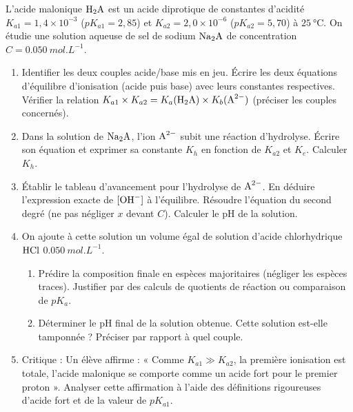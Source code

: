 \documentclass[11pt]{article}
\begin{document}
\begin{exercice}
L'acide malonique $\ce{H2A}$ est un acide diprotique de constantes d'acidité $K_{a1} = 1,4 \times 10^{-3}$ ($pK_{a1} = 2,85$) et $K_{a2} = 2,0 \times 10^{-6}$ ($pK_{a2} = 5,70$) à $\SI{25}{\celsius}$. On étudie une solution aqueuse de sel de sodium $\ce{Na2A}$ de concentration $C = \SI{0.050}{mol.L^{-1}}$.

\begin{enumerate}
    \item Identifier les deux couples acide/base mis en jeu. Écrire les deux équations d'équilibre d'ionisation (acide puis base) avec leurs constantes respectives. Vérifier la relation $K_{a1} \times K_{a2} = K_{a}(\ce{H2A}) \times K_{b}(\ce{A^2-})$ (préciser les couples concernés).
    \item Dans la solution de $\ce{Na2A}$, l'ion $\ce{A^2-}$ subit une réaction d'hydrolyse. Écrire son équation et exprimer sa constante $K_h$ en fonction de $K_{a2}$ et $K_e$. Calculer $K_h$.
    \item Établir le tableau d'avancement pour l'hydrolyse de $\ce{A^2-}$. En déduire l'expression exacte de $[\ce{OH-}]$ à l'équilibre. Résoudre l'équation du second degré (ne pas négliger $x$ devant $C$). Calculer le pH de la solution.
    \item On ajoute à cette solution un volume égal de solution d'acide chlorhydrique $\ce{HCl}$ $\SI{0.050}{mol.L^{-1}}$.
    \begin{enumerate}
        \item Prédire la composition finale en espèces majoritaires (négliger les espèces traces). Justifier par des calculs de quotients de réaction ou comparaison de $pK_a$.
        \item Déterminer le pH final de la solution obtenue. Cette solution est-elle tamponnée ? Préciser par rapport à quel couple.
    \end{enumerate}
    \item Critique : Un élève affirme : « Comme $K_{a1} \gg K_{a2}$, la première ionisation est totale, l'acide malonique se comporte comme un acide fort pour le premier proton ». Analyser cette affirmation à l'aide des définitions rigoureuses d'acide fort et de la valeur de $pK_{a1}$.
\end{enumerate}
\end{exercice}
\end{document}
